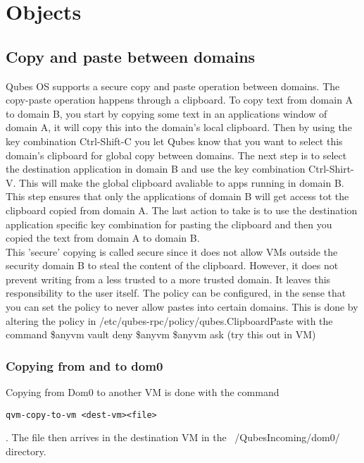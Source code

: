\documentclass[runningheads,a4paper]{article}
\begin{document}
\section{Objects}
\subsection{Copy and paste between domains} 

Qubes OS supports a secure
copy and paste operation between domains.  The copy-paste operation
happens through a clipboard.  To copy text from domain A to domain B,
you start by copying some text in an applications window of domain A,
it will copy this into the domain's local clipboard.  Then by using
the key combination Ctrl-Shift-C you let Qubes know that you want to
select this domain's clipboard for global copy between domains.  The
next step is to select the destination application in domain B and use
the key combination Ctrl-Shirt-V.  This will make the global clipboard
avaliable to apps running in domain B.  This step ensures that only
the applications of domain B will get access tot the clipboard copied
from domain A.  The last action to take is to use the destination
application specific key combination for pasting the clipboard and
then you copied the text from domain A to domain B.\\ This 'secure'
copying is called secure since it does not allow VMs outside the
security domain B to steal the content of the clipboard.  However, it
does not prevent writing from a less trusted to a more trusted domain.
It leaves this responsibility to the user itself.  The policy can be
configured, in the sense that you can set the policy to never allow
pastes into certain domains.  This is done by altering the policy in
/etc/qubes-rpc/policy/qubes.ClipboardPaste with the command \$anyvm
vault deny \$anyvm \$anyvm ask (try this out in VM)

\subsubsection{Copying from and to dom0} 

Copying from Dom0 to another
VM is done with the command
\begin{verbatim}
qvm-copy-to-vm <dest-vm><file>
\end{verbatim}.
The file then arrives in the destination VM in the
~/QubesIncoming/dom0/ directory.
\end{document}

